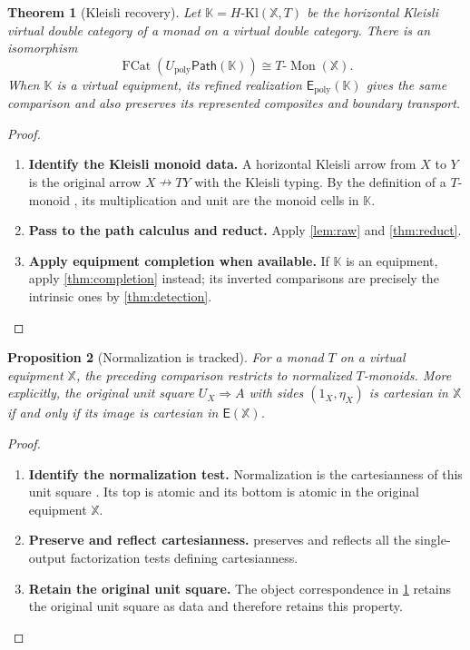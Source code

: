 \documentclass[11pt,reqno]{amsart}
\theoremstyle{plain}
\newtheorem{theorem}{Theorem}[section]
\newtheorem{proposition}[theorem]{Proposition}
\theoremstyle{definition}
\theoremstyle{remark}
\numberwithin{equation}{section}
\newcommand{\E}{\mathsf E}
\newcommand{\Up}{U_{\mathrm{poly}}}
\newcommand{\harr}{\mathrel{\nrightarrow}}
\newcommand{\cell}{\mathrel{\Longrightarrow}}
\newcommand{\Mon}{\operatorname{Mon}}
\newcommand{\FCat}{\operatorname{FCat}}
\newcommand{\Raw}{\mathsf{Path}}
\begin{document}
\begin{theorem}[Kleisli recovery]\label{thm:kleisli}
Let $\mathbb K=H\text{-}\mathrm{Kl}(\mathbb X,T)$ be the horizontal
Kleisli virtual double category of a monad on a virtual double category.
There is an isomorphism
\[
 \FCat(\Up\Raw(\mathbb K))\cong T\text{-}\Mon(\mathbb X).
\]
When $\mathbb K$ is a virtual equipment, its refined realization
$\E_{\mathrm{poly}}(\mathbb K)$ gives the same comparison and also
preserves its represented composites and boundary transport.
\end{theorem}
\begin{proof}\leavevmode
\begin{enumerate}
\item \textbf{Identify the Kleisli monoid data.} A horizontal Kleisli arrow from $X$ to $Y$ is the original arrow
$X\harr TY$ with the Kleisli typing. By the definition of a $T$-monoid
\cite[Definition 4.3]{CruttwellShulman2010}, its multiplication and
unit are the monoid cells in $\mathbb K$.

\item \textbf{Pass to the path calculus and reduct.} Apply \cref{lem:raw} and
\cref{thm:reduct}.

\item \textbf{Apply equipment completion when available.} If $\mathbb K$ is an equipment, apply
\cref{thm:completion} instead; its inverted comparisons are precisely
the intrinsic ones by \cref{thm:detection}.\qedhere
\end{enumerate}
\end{proof}

\begin{proposition}[Normalization is tracked]\label{prop:normalization}
For a monad $T$ on a virtual equipment $\mathbb X$, the preceding
comparison restricts to normalized $T$-monoids. More explicitly, the
original unit square
$U_X\cell A$ with sides $(1_X,\eta_X)$ is cartesian in $\mathbb X$
if and only if its image is cartesian in $\E(\mathbb X)$.
\end{proposition}
\begin{proof}\leavevmode
\begin{enumerate}
\item \textbf{Identify the normalization test.} Normalization is the cartesianness of this unit square
\cite[Definition 8.2]{CruttwellShulman2010}. Its top is atomic and its
bottom is atomic in the original equipment $\mathbb X$.

\item \textbf{Preserve and reflect cartesianness.}  preserves and reflects all the single-output
factorization tests defining cartesianness.

\item \textbf{Retain the original unit square.} The object correspondence in
\cref{thm:kleisli} retains the original unit square as data and
therefore retains this property.\qedhere
\end{enumerate}
\end{proof}
\end{document}
